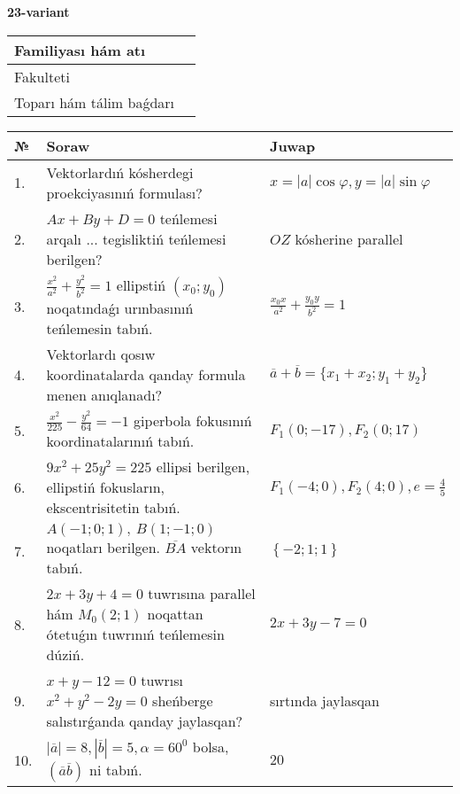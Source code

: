 \documentclass{article}
\begin{document}
\egroup

\newpage


\textbf{23-variant}\\

\bgroup
\def\arraystretch{1.6} %

\begin{tabular}{|m{5.7cm}|m{9.5cm}|}
\hline
Familiyası hám atı & \\
\hline
Fakulteti  & \\
\hline
Toparı hám tálim baǵdarı  & \\
\hline
\end{tabular}

\vspace{1cm}

\begin{tabular}{|m{0.7cm}|m{10cm}|m{4cm}|}
\hline
№ & Soraw & Juwap \\
\hline
1. & Vektorlardıń kósherdegi proekciyasınıń formulası? & $x=|a|\cos\varphi, y=|a|\sin\varphi$ \\
\hline
2. & $Ax+By+D=0$ teńlemesi arqalı ... tegisliktiń teńlemesi berilgen? & $OZ$ kósherine parallel \\
\hline
3. & $\frac{x^2}{a^2}+\frac{y^2}{b^2}=1$ ellipstiń $(x_0;y_0)$ noqatındaǵı urınbasınıń teńlemesin tabıń. & $\frac{x_0x}{a^2}+\frac{y_0y}{b^2}=1$ \\
\hline
4. & Vektorlardı qosıw koordinatalarda qanday formula menen anıqlanadı? & $\overline{a}+\overline{b}=\{x_1+x_2;y_1+y_2\}$ \\
\hline
5. & $\frac{x^{2}}{225}-\frac{y^{2}}{64}=-1$ giperbola fokusınıń koordinatalarınıń tabıń. & $F_{1}(0;-17), F_{2}(0;17)$ \\
\hline
6. & $9x^{2}+25y^{2}=225$ ellipsi berilgen, ellipstiń fokusların, ekscentrisitetin tabıń. & $F_1\left(-4;0 \right) , F_2\left( 4;0 \right) , e = \frac{4}{5}$ \\
\hline
7. & $A (-1;0;1),\ B (1;-1;0)$ noqatları berilgen. $\overline{BA}$ vektorın tabıń. & $\left\{ - 2;1;1 \right\}$ \\
\hline
8. & $2x+3y+4=0$ tuwrısına parallel hám $M_{0} (2;1)$ noqattan ótetuǵın tuwrınıń teńlemesin dúziń. & $2x+3y-7=0$ \\
\hline
9. & $x+y-12=0$ tuwrısı $x^{2}+y^{2}-2y=0$ sheńberge salıstırǵanda qanday jaylasqan? & sırtında jaylasqan \\
\hline
10. & $\left| \overline{a} \right|=8, \left| \overline{b} \right|=5, \alpha=60^{0}$ bolsa, $( \overline{a}\overline{b} )$ ni tabıń. & $20$ \\
\hline
\end{tabular}
\end{document}
